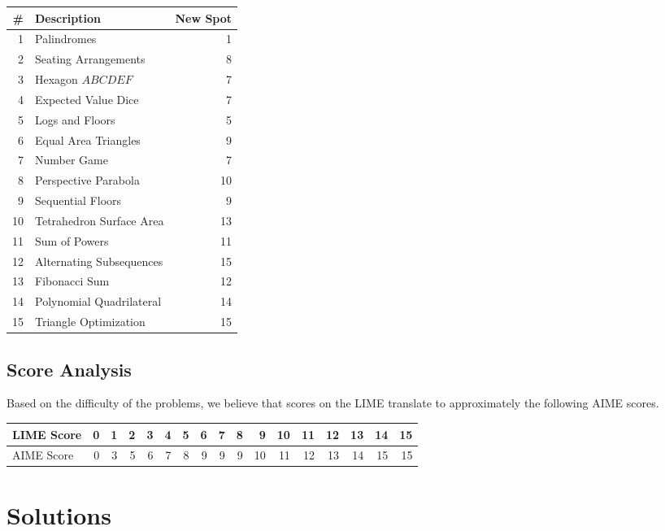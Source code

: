 \documentclass[11pt]{scrartcl}
\begin{document}
\begin{center}
    \begin{tabular}{r l | r}
        \# & Description & New Spot \\
        \hline
        1 & Palindromes & 1 \\
        2 & Seating Arrangements & 8 \\
        3 & Hexagon $ABCDEF$ & 7 \\
        4 & Expected Value Dice & 7 \\
        5 & Logs and Floors & 5 \\
        6 & Equal Area Triangles & 9 \\
        7 & Number Game & 7 \\
        8 & Perspective Parabola & 10 \\
        9 & Sequential Floors & 9 \\
        10 & Tetrahedron Surface Area & 13 \\
        11 & Sum of Powers & 11 \\
        12 & Alternating Subsequences & 15 \\
        13 & Fibonacci Sum & 12 \\
        14 & Polynomial Quadrilateral & 14 \\
        15 & Triangle Optimization & 15
    \end{tabular}
\end{center}

\subsection{Score Analysis}

Based on the difficulty of the problems, we believe that scores on the LIME translate to approximately the following AIME scores.

\begin{center}
    \begin{tabular}{l | r r r r r r r r r r r r r r r r}
        LIME Score & 0 & 1 & 2 & 3 & 4 & 5 & 6 & 7 & 8 & 9 & 10 & 11 & 12 & 13 & 14 & 15 \\
        \hline
        AIME Score & 0 & 3 & 5 & 6 & 7 & 8 & 9 & 9 & 9 & 10 & 11 & 12 & 13 & 14 & 15 & 15
    \end{tabular}
\end{center}

\pagebreak

\section{Solutions}
\end{document}
